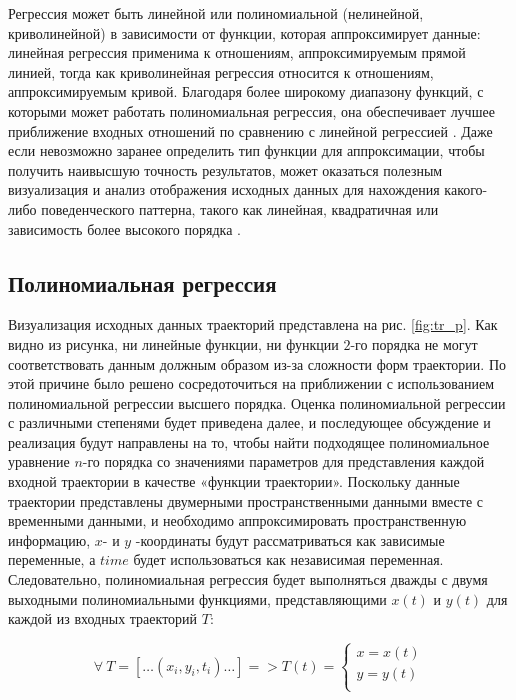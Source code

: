 Регрессия может быть линейной или полиномиальной (нелинейной, криволинейной) в зависимости от функции, которая аппроксимирует данные: линейная регрессия применима к отношениям, аппроксимируемым прямой линией, тогда как криволинейная регрессия относится к отношениям,  аппроксимируемым кривой. Благодаря более широкому диапазону функций, с которыми может работать полиномиальная регрессия, она обеспечивает лучшее приближение входных отношений по сравнению с линейной регрессией \cite{online:intro_lr_pr}. Даже если невозможно заранее определить тип функции для аппроксимации, чтобы получить наивысшую точность результатов, может оказаться полезным визуализация и анализ отображения исходных данных для нахождения какого-либо поведенческого паттерна, такого как линейная, квадратичная или зависимость более высокого порядка \cite{article:behav_form_extr}.

\subsection{Полиномиальная регрессия}

Визуализация исходных данных траекторий представлена на рис. \ref{fig:tr_p}. Как видно из рисунка, ни линейные функции, ни функции $2$-го порядка не могут соответствовать данным должным образом из-за сложности форм траектории. По этой причине было решено сосредоточиться на приближении с использованием полиномиальной регрессии высшего порядка. Оценка полиномиальной регрессии с различными степенями будет приведена далее, и последующее обсуждение и реализация будут направлены на то, чтобы найти подходящее полиномиальное уравнение $n$-го порядка со значениями параметров для представления каждой входной траектории в качестве «функции траектории». Поскольку данные траектории представлены двумерными пространственными данными вместе с временными данными, и необходимо аппроксимировать пространственную информацию, $x$- и $y$ -координаты будут рассматриваться как зависимые переменные, а $time$ будет использоваться как независимая переменная. Следовательно, полиномиальная регрессия будет выполняться дважды с двумя выходными полиномиальными функциями, представляющими $x(t)$ и $y(t)$ для каждой из входных траекторий $T$:

\begin{equation}\label{eq:regr-func}
	\forall\ T = [\ldots (x_i, y_i, t_i) \ldots] = > T(t) = 
		\begin{cases}
			x = x(t) \\
			y = y(t) \\
		\end{cases}
\end{equation}

